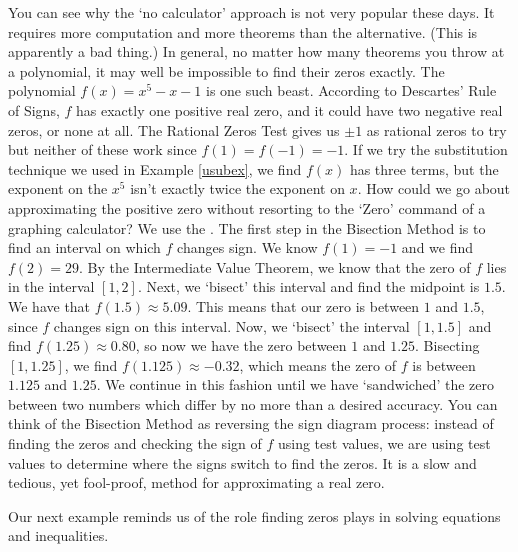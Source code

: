 You can see why the `no calculator' approach is not very popular these days.  It requires more computation and more theorems than the alternative. (This is apparently a bad thing.)  In general, no matter how many theorems you throw at a polynomial, it may well be impossible to find their zeros exactly.  The polynomial $f(x) = x^5-x-1$ is one such beast.  According to Descartes' Rule of Signs, $f$ has exactly one positive real zero, and it could have two negative real zeros, or none at all.  The Rational Zeros Test gives us $\pm 1$ as rational zeros to try but neither of these work since $f(1) = f(-1) = -1$.  If we try the substitution technique we used in Example \ref{usubex}, we find $f(x)$ has three terms, but the exponent on the $x^5$ isn't exactly twice the exponent on $x$.  How could we go about approximating the positive zero without resorting to the `Zero' command of a graphing calculator?  We use the  .  The first step in the Bisection Method is to find an interval on which $f$ changes sign.  We know $f(1) = -1$ and we find $f(2) = 29$.  By the Intermediate Value Theorem, we know that the zero of $f$ lies in the interval $[1,2]$.  Next, we `bisect' this interval and find the midpoint is $1.5$.  We have that $f(1.5)\approx 5.09$.  This means that our zero is between $1$ and $1.5$, since $f$ changes sign on this interval.  Now, we `bisect' the interval $[1,1.5]$ and find $f(1.25) \approx 0.80$, so now we have the zero between $1$ and $1.25$.  Bisecting $[1,1.25]$, we find $f(1.125) \approx -0.32$, which means the zero of $f$ is between $1.125$ and $1.25$.  We continue in this fashion until we have `sandwiched' the zero between two numbers which differ by no more than a desired accuracy. You can think of the Bisection Method as reversing the sign diagram process:  instead of finding the zeros and checking the sign of $f$ using test values, we are using test values to determine where the signs switch to find the zeros.  It is a slow and tedious, yet fool-proof, method for approximating a real zero.  


Our next example reminds us of the role finding zeros plays in solving equations and inequalities.

\medskip

